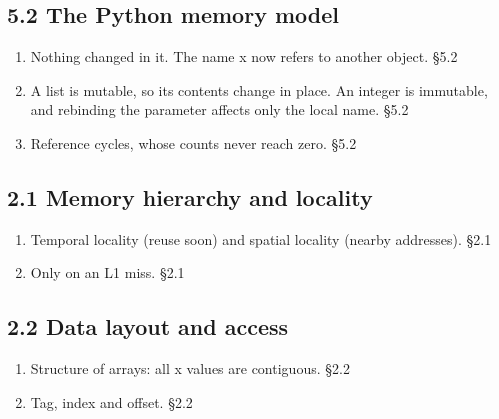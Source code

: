\documentclass[11pt]{article}
\begin{document}
\begin{keepsection}\subsection{5.2 The Python memory model}

\begin{enumerate}
\item Nothing changed in it. The name x now refers to another object. \hfill{\small\color{FAUblue}§5.2}
\item A list is mutable, so its contents change in place. An integer is immutable, and rebinding the parameter affects only the local name. \hfill{\small\color{FAUblue}§5.2}
\item Reference cycles, whose counts never reach zero. \hfill{\small\color{FAUblue}§5.2}
\end{enumerate}

\end{keepsection}
\begin{keepsection}\subsection{2.1 Memory hierarchy and locality}

\begin{enumerate}
\item Temporal locality (reuse soon) and spatial locality (nearby addresses). \hfill{\small\color{FAUblue}§2.1}
\item Only on an L1 miss. \hfill{\small\color{FAUblue}§2.1}
\end{enumerate}

\end{keepsection}
\begin{keepsection}\subsection{2.2 Data layout and access}

\begin{enumerate}
\item Structure of arrays: all x values are contiguous. \hfill{\small\color{FAUblue}§2.2}
\item Tag, index and offset. \hfill{\small\color{FAUblue}§2.2}
\end{enumerate}

\end{keepsection}
\end{document}
